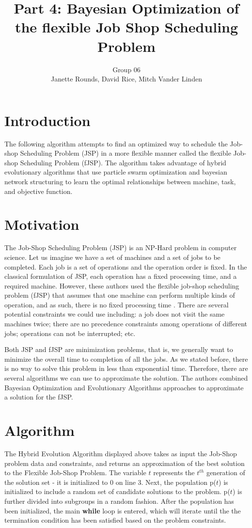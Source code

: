 \documentclass[11pt,twocolumn]{article}
\title{Part 4: Bayesian Optimization of the flexible Job Shop Scheduling Problem}
\author{Group 06 \\ 
\small Janette Rounds, \small David Rice, \small Mitch Vander Linden}
\begin{document}
\maketitle


\section{Introduction}
The following algorithm attempts to find an optimized way to schedule the Job-shop Scheduling Problem (JSP) in a more flexible manner called the flexible Job-shop Scheduling Problem (fJSP). The algorithm takes advantage of hybrid evolutionary algorithms that use particle swarm optimization and bayesian network structuring to learn the optimal relationships between machine, task, and objective function. 

\section{Motivation}
The Job-Shop Scheduling Problem (JSP) is an NP-Hard problem in computer science\cite{cheng1996tutorial}. Let us imagine we have a set of machines and a set of jobs to be completed. Each job is a set of operations and the operation order is fixed. In the classical formulation of JSP, each operation has a fixed processing time, and a required machine. However, these authors used the flexible job-shop scheduling problem (fJSP) that assumes that one machine can perform multiple kinds of operation, and as such, there is no fixed processing time \cite{sun2015bayesian}. There are several potential constraints we could use including: a job does not visit the same machines twice; there are no precedence constraints among operations of different jobs; operations can not be interrupted; etc. 

Both JSP and fJSP are minimization problems, that is, we generally want to minimize the overall time to completion of all the jobs. As we stated before, there is no way to solve this problem in less than exponential time. Therefore, there are several algorithms we can use to approximate the solution. The authors combined Bayesian Optimization and Evolutionary Algorithms approaches to approximate a solution for the fJSP. 
\section{Algorithm}
The Hybrid Evolution Algorithm displayed above takes as input the Job-Shop problem data and constraints, and returns an approximation of the best solution to the Flexible Job-Shop Problem. The variable $t$ represents the $t^{th}$ generation of the solution set - it is initialized to 0 on line 3. Next, the population p($t$) is initialized to include a random set of candidate solutions to the problem. p($t$) is further divided into subgroups in a random fashion. After the population has been initialized, the main \textbf{while} loop is entered, which will iterate until the the termination condition has been satisfied based on the problem constraints.
\end{document}
